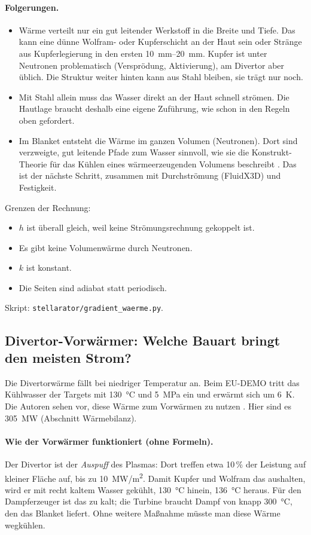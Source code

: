 \documentclass[10pt,a4paper]{article}
\begin{document}
\paragraph{Folgerungen.}
\begin{itemize}
\item Wärme verteilt nur ein gut leitender Werkstoff in die Breite und Tiefe. Das kann eine dünne Wolfram- oder Kupferschicht an der Haut sein oder Stränge aus Kupferlegierung in den ersten \SIrange{10}{20}{mm}. Kupfer ist unter Neutronen problematisch (Versprödung, Aktivierung), am Divertor aber üblich. Die Struktur weiter hinten kann aus Stahl bleiben, sie trägt nur noch.
\item Mit Stahl allein muss das Wasser direkt an der Haut schnell strömen. Die Hautlage braucht deshalb eine eigene Zuführung, wie schon in den Regeln oben gefordert.
\item Im Blanket entsteht die Wärme im ganzen Volumen (Neutronen). Dort sind verzweigte, gut leitende Pfade zum Wasser sinnvoll, wie sie die Konstrukt-Theorie für das Kühlen eines wärmeerzeugenden Volumens beschreibt \cite{bejan1997}. Das ist der nächste Schritt, zusammen mit Durchströmung (FluidX3D) und Festigkeit.
\end{itemize}
Grenzen der Rechnung:
\begin{itemize}
\item $h$ ist überall gleich, weil keine Strömungsrechnung gekoppelt ist.
\item Es gibt keine Volumenwärme durch Neutronen.
\item $k$ ist konstant.
\item Die Seiten sind adiabat statt periodisch.
\end{itemize}
Skript: \texttt{stellarator/gradient\_waerme.py}.

\subsection{Divertor-Vorwärmer: Welche Bauart bringt den meisten Strom?}\label{sec:vorwaermer}
Die Divertorwärme fällt bei niedriger Temperatur an. Beim EU-DEMO tritt das Kühlwasser der Targets mit
\SI{130}{\celsius} und \SI{5}{MPa} ein und erwärmt sich um \SI{6}{K}. Die Autoren sehen vor, diese Wärme zum
Vorwärmen zu nutzen \cite{you2022}. Hier sind es \SI{305}{MW} (Abschnitt Wärmebilanz).

\paragraph{Wie der Vorwärmer funktioniert (ohne Formeln).} Der Divertor ist der \emph{Auspuff} des Plasmas: Dort
treffen etwa 10\,\% der Leistung auf kleiner Fläche auf, bis zu \SI{10}{MW/m^2}. Damit Kupfer und Wolfram das
aushalten, wird er mit recht kaltem Wasser gekühlt, \SI{130}{\celsius} hinein, \SI{136}{\celsius} heraus. Für den
Dampferzeuger ist das zu kalt; die Turbine braucht Dampf von knapp \SI{300}{\celsius}, den das Blanket liefert.
Ohne weitere Maßnahme müsste man diese Wärme wegkühlen.
\end{document}
